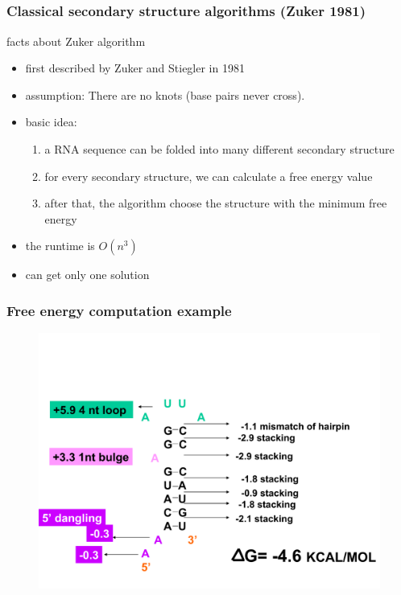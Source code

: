 \documentclass[ignorenonframetext,10pt]{beamer}
\begin{document}
\subsection{}
\begin{frame}
\frametitle{\large Classical secondary structure algorithms (Zuker 1981)}
  \begin{block}{facts about Zuker algorithm}
    \begin{itemize}
    \item first described by Zuker and Stiegler in 1981
    \item assumption: There are no knots (base pairs never cross).
    \item basic idea: 
    \begin{enumerate}
      \item a RNA sequence can be folded into many different secondary structure
      \item for every secondary structure, we can calculate a free energy value
      \item after that, the algorithm choose the structure with the minimum free energy
    \end{enumerate}
    \item the runtime is $O(n^3)$
    \item can get only one solution
    \end{itemize}
  \end{block}
\end{frame}


\begin{frame}
\frametitle{Free energy computation example}  
\begin{figure}
  \includegraphics[scale=0.4]{images/mfe_example.pdf} 
\end{figure}
\end{frame}
\end{document}
